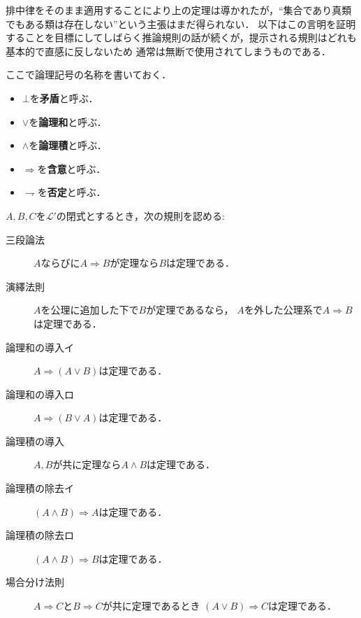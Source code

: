 	排中律をそのまま適用することにより上の定理は導かれたが，``集合であり真類でもある類は存在しない''という主張はまだ得られない．
	以下はこの言明を証明することを目標にしてしばらく推論規則の話が続くが，提示される規則はどれも基本的で直感に反しないため
	通常は無断で使用されてしまうものである．
	
	ここで論理記号の名称を書いておく．
	\begin{itemize}
		\item $\bot$を{\bf 矛盾}と呼ぶ．
		\item $\vee$を{\bf 論理和}と呼ぶ．
		\item $\wedge$を{\bf 論理積}と呼ぶ．
		\item $\Longrightarrow$を{\bf 含意}と呼ぶ．
		\item $\rightharpoondown$を{\bf 否定}と呼ぶ．
	\end{itemize}
	
	\begin{screen}
		\begin{logicalaxm}[基本的な推論規則]\label{logicalaxm:fundamental_rules_of_inference}
			$A,B,C$を$\mathcal{L}'$の閉式とするとき，次の規則を認める:
			\begin{description}
				\item[三段論法] $A$ならびに$A \Longrightarrow B$が定理なら$B$は定理である．
				\item[演繹法則] $A$を公理に追加した下で$B$が定理であるなら，
					$A$を外した公理系で$A \Longrightarrow B$は定理である．
				\item[論理和の導入イ] $A \Longrightarrow (A \vee B)$は定理である．
				\item[論理和の導入ロ] $A \Longrightarrow (B \vee A)$は定理である．
				\item[論理積の導入] $A,B$が共に定理なら$A \wedge B$は定理である．
				\item[論理積の除去イ] $(A \wedge B) \Longrightarrow A$は定理である．
				\item[論理積の除去ロ] $(A \wedge B) \Longrightarrow B$は定理である．
				\item[場合分け法則] $A \Longrightarrow C$と$B \Longrightarrow C$が共に定理であるとき
					$(A \vee B) \Longrightarrow C$は定理である．
			\end{description}	
		\end{logicalaxm}
	\end{screen}
	
